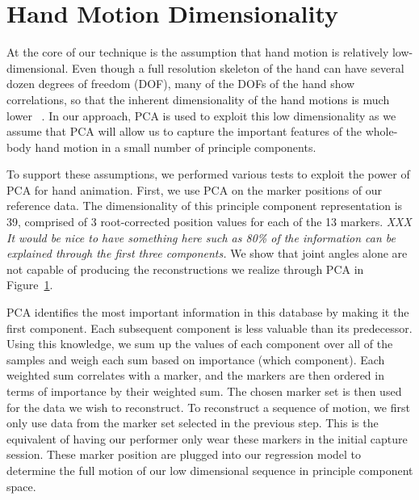 \section{Hand Motion Dimensionality}

At the core of our technique is the assumption that hand motion is relatively low-dimensional.  Even though a full resolution skeleton of the hand can have several dozen degrees of freedom (DOF), many of the DOFs of the hand show correlations, so that the inherent dimensionality of the hand motions is much lower ~\cite{SanFlaSoe98,BraZha04,JoeOSu09}. In our approach, PCA is used to exploit this low dimensionality as we assume that PCA will allow us to capture the important features of the whole-body hand motion in a small number of principle components.  

To support these assumptions, we performed various tests to exploit the power of PCA for hand animation. First, we use PCA on the marker positions of our reference data. The dimensionality of this principle component representation is 39, comprised of 3 root-corrected position values for each of the 13 markers.  \emph{XXX It would be nice to have something here such as 80\% of the information can be explained through the first three components.}
We show that joint angles alone are not capable of producing the reconstructions we realize through PCA in Figure~\ref{}. 

\begin{figure}
  \centering
\end{figure}

PCA identifies the most important information in this database by making it the first component. Each subsequent component is less valuable than its predecessor. Using this knowledge, we sum up the values of each component over all of the samples and weigh each sum based on importance (which component). Each weighted sum correlates with a marker, and the markers are then ordered in terms of importance by their weighted sum. The chosen marker set is then used for the data we wish to reconstruct. 
To reconstruct a sequence of motion, we first only use data from the marker set selected in the previous step. This is the equivalent of having our performer only wear these markers in the initial capture session. These marker position are plugged into our regression model to determine the full motion of our low dimensional sequence in principle component space.

